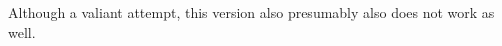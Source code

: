 \documentclass{article}
\newcommand{\solution}[1]{}
\begin{document}
\solution{

  $$\Phi^*\; = \;\argmin_\Phi \;E_{(s,\pi,R) \sim \mathrm{Replay},\;a \sim \pi}\;\left(\begin{array}{l} (V_\Phi(s) - z)^2
    \\ \\
    \lambda_A\;(A_\Phi(s,a) - \hat{A}(s,a))^2 \\ \\ + \lambda_R\;||\Phi||^2\end{array}\right)\;\;\;\;(2)$$

}

\medskip
Although a valiant attempt, this version also presumably also does not work as well.
\end{document}
